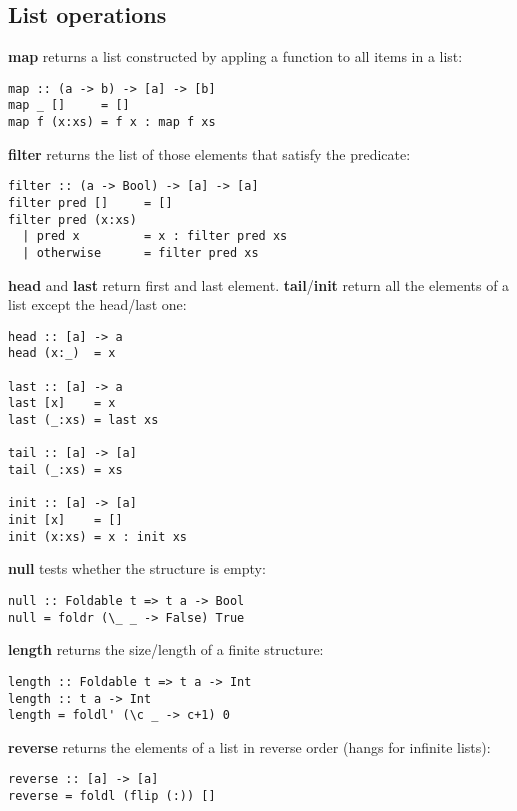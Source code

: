 %

\subsection{List operations}

\textbf{map} returns a list constructed by appling a function to all items in a list:
\begin{verbatim}
map :: (a -> b) -> [a] -> [b]
map _ []     = []
map f (x:xs) = f x : map f xs
\end{verbatim}

\textbf{filter} returns the list of those elements that satisfy the predicate:
\begin{verbatim}
filter :: (a -> Bool) -> [a] -> [a]
filter pred []     = []
filter pred (x:xs)
  | pred x         = x : filter pred xs
  | otherwise      = filter pred xs
\end{verbatim}


\textbf{head} and \textbf{last} return first and last element.
\textbf{tail}/\textbf{init} return all the elements of a list except the head/last one:
\begin{verbatim}
head :: [a] -> a
head (x:_)  = x

last :: [a] -> a
last [x]    = x
last (_:xs) = last xs

tail :: [a] -> [a]
tail (_:xs) = xs

init :: [a] -> [a]
init [x]    = []
init (x:xs) = x : init xs
\end{verbatim}

\textbf{null} tests whether the structure is empty:
\begin{verbatim}
null :: Foldable t => t a -> Bool
null = foldr (\_ _ -> False) True
\end{verbatim}

\textbf{length} returns the size/length of a finite structure:
\begin{verbatim}
length :: Foldable t => t a -> Int 
length :: t a -> Int
length = foldl' (\c _ -> c+1) 0
\end{verbatim}

\textbf{reverse} returns the elements of a list in reverse order (hangs for infinite lists):
\begin{verbatim}
reverse :: [a] -> [a]
reverse = foldl (flip (:)) []
\end{verbatim}



